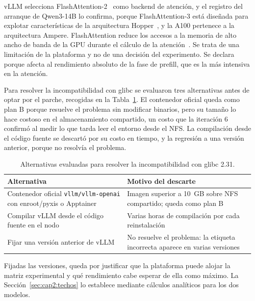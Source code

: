 vLLM selecciona FlashAttention-2~\cite{dao2024flashattention2} como backend de atención, y el registro del arranque de Qwen3-14B lo confirma, porque FlashAttention-3 está diseñada para explotar características de la arquitectura Hopper~\cite{shah2024flashattention3}, y la A100 pertenece a la arquitectura Ampere. FlashAttention reduce los accesos a la memoria de alto ancho de banda de la GPU durante el cálculo de la atención~\cite{dao2022flashattention}.
Se trata de una limitación de la plataforma y no de una decisión del experimento. Se declara porque afecta al rendimiento absoluto de la fase de prefill, que es la más intensiva en la atención.

Para resolver la incompatibilidad con glibc se evaluaron tres alternativas antes de optar por el parche, recogidas en la Tabla~\ref{tab:cap2:alternativas}. El contenedor oficial queda como plan B porque resuelve el problema sin modificar binarios, pero su tamaño lo hace costoso en el almacenamiento compartido, un costo que la iteración 6 confirmó al medir lo que tarda leer el entorno desde el NFS. La compilación desde el código fuente se descartó por su costo en tiempo, y la regresión a una versión anterior, porque no resolvía el problema.

\begin{table}[htbp]
  \centering
  \caption{Alternativas evaluadas para resolver la incompatibilidad con glibc 2.31.}
  \label{tab:cap2:alternativas}
  \small
  \begin{tabular}{|p{}|p{}|}
    \hline
    \textbf{Alternativa} & \textbf{Motivo del descarte} \\
    \hline
    Contenedor oficial \texttt{vllm/vllm-openai} con enroot/pyxis o Apptainer & Imagen superior a 10~GB sobre NFS compartido; queda como plan B \\
    \hline
    Compilar vLLM desde el código fuente en el nodo & Varias horas de compilación por cada reinstalación \\
    \hline
    Fijar una versión anterior de vLLM & No resuelve el problema: la etiqueta incorrecta aparece en varias versiones \\
    \hline
  \end{tabular}
\end{table}

Fijadas las versiones, queda por justificar que la plataforma puede alojar la matriz experimental y qué rendimiento cabe esperar de ella como máximo. La Sección~\ref{sec:cap2:techos} lo establece mediante cálculos analíticos para los dos modelos.

